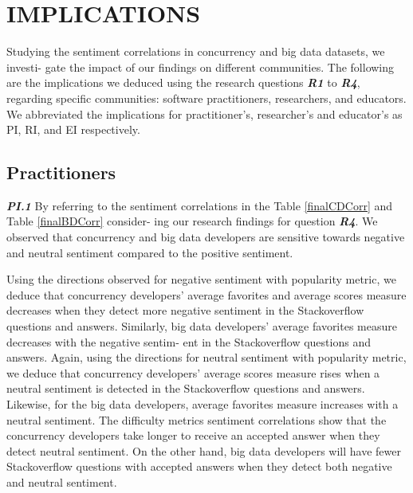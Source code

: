 \chapter{IMPLICATIONS}
Studying the sentiment correlations in concurrency and big data datasets, we investi- gate the impact of our findings on different communities. The following are the
implications we deduced using the research questions \emph{\textbf{R1}} to \emph{\textbf{R4}}, regarding specific communities: software practitioners, researchers, and educators. We abbreviated the implications for practitioner's, researcher's and educator's as PI, RI, and EI respectively.



\section {Practitioners}
\emph{\textbf{PI.1}} By referring to the sentiment correlations in the Table \ref{finalCDCorr} and Table \ref{finalBDCorr} consider- ing our research findings for question \emph{\textbf{R4}}. We observed that concurrency and big data developers are sensitive towards negative and neutral sentiment compared to the positive sentiment.

Using the directions observed for negative sentiment with popularity metric, we deduce that concurrency developers' average favorites and average scores measure decreases when they detect more negative sentiment in the Stackoverflow questions and answers. Similarly, big data developers' average favorites measure decreases with the negative sentim- ent in the Stackoverflow questions and answers. Again, using the directions for neutral sentiment with popularity metric, we deduce that concurrency developers' average scores measure rises when a neutral sentiment is detected in the Stackoverflow questions and answers. Likewise, for the big data developers, average favorites measure increases with a neutral sentiment. The difficulty metrics sentiment correlations show that the concurrency developers take longer to receive an accepted answer when they detect neutral sentiment. On the other hand, big data developers will have fewer Stackoverflow questions with accepted answers when they detect both negative and neutral sentiment.

